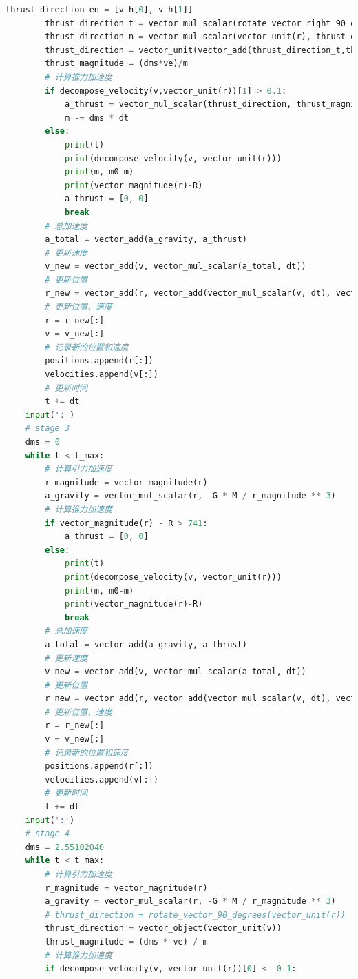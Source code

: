 \documentclass{ctexart}
\begin{document}
\begin{lstlisting}[language=Python, caption={主代码}, xleftmargin=0pt]
        thrust_direction_en = [v_h[0], v_h[1]]
        thrust_direction_t = vector_mul_scalar(rotate_vector_right_90_degrees(vector_unit(r)), thrust_direction_en[1])
        thrust_direction_n = vector_mul_scalar(vector_unit(r), thrust_direction_en[0])
        thrust_direction = vector_unit(vector_add(thrust_direction_t,thrust_direction_n))
        thrust_magnitude = (dms*ve)/m
        # 计算推力加速度
        if decompose_velocity(v,vector_unit(r))[1] > 0.1:
            a_thrust = vector_mul_scalar(thrust_direction, thrust_magnitude)
            m -= dms * dt
        else:
            print(t)
            print(decompose_velocity(v, vector_unit(r)))
            print(m, m0-m)
            print(vector_magnitude(r)-R)
            a_thrust = [0, 0]
            break
        # 总加速度
        a_total = vector_add(a_gravity, a_thrust)
        # 更新速度
        v_new = vector_add(v, vector_mul_scalar(a_total, dt))
        # 更新位置
        r_new = vector_add(r, vector_add(vector_mul_scalar(v, dt), vector_mul_scalar(a_total, 0.5 * dt**2)))
        # 更新位置、速度
        r = r_new[:]
        v = v_new[:]
        # 记录新的位置和速度
        positions.append(r[:])
        velocities.append(v[:])
        # 更新时间
        t += dt
    input(':')
    # stage 3
    dms = 0
    while t < t_max:
        # 计算引力加速度
        r_magnitude = vector_magnitude(r)
        a_gravity = vector_mul_scalar(r, -G * M / r_magnitude ** 3)
        # 计算推力加速度
        if vector_magnitude(r) - R > 741:
            a_thrust = [0, 0]
        else:
            print(t)
            print(decompose_velocity(v, vector_unit(r)))
            print(m, m0-m)
            print(vector_magnitude(r)-R)
            break
        # 总加速度
        a_total = vector_add(a_gravity, a_thrust)
        # 更新速度
        v_new = vector_add(v, vector_mul_scalar(a_total, dt))
        # 更新位置
        r_new = vector_add(r, vector_add(vector_mul_scalar(v, dt), vector_mul_scalar(a_total, 0.5 * dt ** 2)))
        # 更新位置、速度
        r = r_new[:]
        v = v_new[:]
        # 记录新的位置和速度
        positions.append(r[:])
        velocities.append(v[:])
        # 更新时间
        t += dt
    input(':')
    # stage 4
    dms = 2.55102040
    while t < t_max:
        # 计算引力加速度
        r_magnitude = vector_magnitude(r)
        a_gravity = vector_mul_scalar(r, -G * M / r_magnitude ** 3)
        # thrust_direction = rotate_vector_90_degrees(vector_unit(r))
        thrust_direction = vector_object(vector_unit(v))
        thrust_magnitude = (dms * ve) / m
        # 计算推力加速度
        if decompose_velocity(v, vector_unit(r))[0] < -0.1:

\end{lstlisting}
\end{document}
